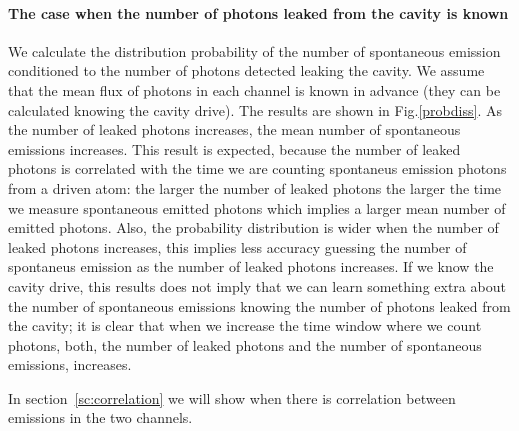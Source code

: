 \documentclass[conference]{IEEEtran}
\begin{document}
\paragraph{The case when the number of photons leaked from the cavity  is known}
We calculate the distribution probability of the number of spontaneous
emission conditioned to the number of photons detected leaking the
cavity. We assume that the mean flux of photons in each channel is
known in advance (they can be calculated knowing the cavity drive).
The results are shown in Fig.\ref{probdiss}. As the number of leaked
photons increases, the mean number of spontaneous emissions increases.
This result is expected, because the number of leaked photons is
correlated with the time we are counting spontaneus emission photons
from a driven atom: the larger the number of leaked photons the larger
the time we measure spontaneous emitted photons which implies a larger
mean number of emitted photons. Also, the probability distribution is
wider when the number of leaked photons increases, this implies less
accuracy guessing the number of spontaneus emission as the number of
leaked photons increases. If we know the cavity drive, this results
does not imply that we can learn something extra about the number of
spontaneous emissions knowing the number of photons leaked from the
cavity; it is clear that when we increase the time window where we
count photons, both, the number of leaked photons and the number of
spontaneous emissions, increases.

In section~\ref{sc:correlation} we will show
when there is correlation between emissions in the two channels.
\end{document}

